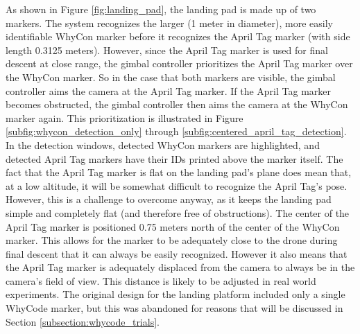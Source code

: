 As shown in Figure \ref{fig:landing_pad}, the landing pad is made up of two markers. The system recognizes the larger (1 meter in diameter), more easily identifiable WhyCon marker before it recognizes the April Tag marker (with side length 0.3125 meters). However, since the April Tag marker is used for final descent at close range, the gimbal controller prioritizes the April Tag marker over the WhyCon marker. So in the case that both markers are visible, the gimbal controller aims the camera at the April Tag marker. If the April Tag marker becomes obstructed, the gimbal controller then aims the camera at the WhyCon marker again. This prioritization is illustrated in Figure \ref{subfig:whycon_detection_only} through \ref{subfig:centered_april_tag_detection}. In the detection windows, detected WhyCon markers are highlighted, and detected April Tag markers have their IDs printed above the marker itself. The fact that the April Tag marker is flat on the landing pad's plane does mean that, at a low altitude, it will be somewhat difficult to recognize the April Tag's pose. However, this is a challenge to overcome anyway, as it keeps the landing pad simple and completely flat (and therefore free of obstructions). The center of the April Tag marker is positioned 0.75 meters north of the center of the WhyCon marker. This allows for the marker to be adequately close to the drone during final descent that it can always be easily recognized. However it also means that the April Tag marker is adequately displaced from the camera to always be in the camera's field of view. This distance is likely to be adjusted in real world experiments. The original design for the landing platform included only a single WhyCode marker, but this was abandoned for reasons that will be discussed in Section \ref{subsection:whycode_trials}.


